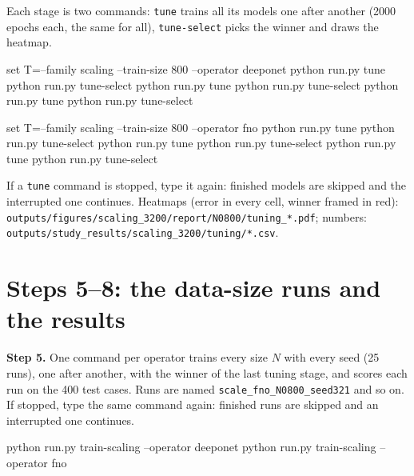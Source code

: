 \documentclass[11pt,a4paper]{article}
\newcommand{\code}[1]{\lstinline{#1}}
\begin{document}
Each stage is two commands: \code{tune} trains all its models one after another (2000 epochs
each, the same for all), \code{tune-select} picks the winner and draws the heatmap.

\begin{cmd}
set T=--family scaling --train-size 800 --operator deeponet
python run.py tune        %
python run.py tune-select %
python run.py tune        %
python run.py tune-select %
python run.py tune        %
python run.py tune-select %
\end{cmd}

\begin{cmd}
set T=--family scaling --train-size 800 --operator fno
python run.py tune        %
python run.py tune-select %
python run.py tune        %
python run.py tune-select %
python run.py tune        %
python run.py tune-select %
\end{cmd}

If a \code{tune} command is stopped, type it again: finished models are skipped and the
interrupted one continues. Heatmaps (error in every cell, winner framed in red):
\code{outputs/figures/scaling_3200/report/N0800/tuning_*.pdf}; numbers:
\code{outputs/study_results/scaling_3200/tuning/*.csv}.

\section{Steps 5--8: the data-size runs and the results}\label{sec:pcscaling}

\textbf{Step 5.} One command per operator trains every size $N$ with every seed (25 runs), one
after another, with the winner of the last tuning stage, and scores each run on the 400 test
cases. Runs are named \code{scale_fno_N0800_seed321} and so on. If stopped, type the same command
again: finished runs are skipped and an interrupted one continues.

\begin{cmd}
python run.py train-scaling --operator deeponet
python run.py train-scaling --operator fno
\end{cmd}
\end{document}
